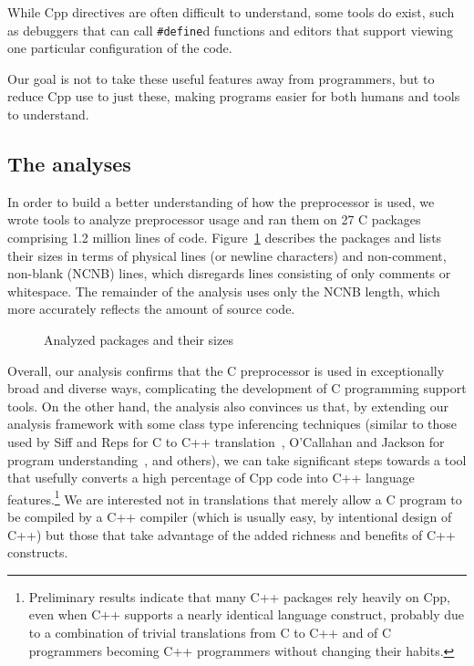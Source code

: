 \documentclass[11pt]{article}
\def\numpackages{27}
\def\numlines{1.2 million}
\begin{document}

While Cpp directives are often difficult to understand, some tools do
exist, such as debuggers that can call {\tt \#define}d functions and
editors that support viewing one particular configuration of the code.

Our goal is not to take these useful features away from programmers, but to
reduce Cpp use to just these, making programs easier for both humans and
tools to understand.


\subsection{The analyses}

In order to build a better understanding of how the preprocessor is used,
we wrote tools to analyze preprocessor usage and ran them on {\numpackages}
C packages comprising {\numlines} lines of code.  Figure~\ref{fig:packages}
describes the packages and lists their sizes in terms of physical lines (or
newline characters) and non-comment, non-blank (NCNB) lines, which
disregards lines consisting of only comments or whitespace.  The remainder
of the analysis uses only the NCNB length, which more accurately reflects
the amount of source code.

\begin{figure}
\centering
{\small
  \setlength{\tabcolsep}{.25em}
  
}
\caption{Analyzed packages and their sizes}
\label{fig:packages}
\end{figure}


Overall, our analysis confirms that the C preprocessor is used in
exceptionally broad and diverse ways, complicating the development of C
programming support tools.  On the other hand, the analysis also convinces
us that, by extending our analysis framework with some class type
inferencing techniques (similar to those used by Siff and Reps for C to C++
translation~\cite{Siff-fse96}, O'Callahan and Jackson for program
understanding~\cite{OCallahan-icse97}, and others), we can take significant
steps towards a tool that usefully converts a high percentage of Cpp code
into C++ language features.\footnote{Preliminary results indicate that many
  C++ packages rely heavily on Cpp, even when C++ supports a nearly
  identical language construct, probably due to a combination of trivial
  translations from C to C++ and of C programmers becoming C++ programmers
  without changing their habits.} We are interested not in translations
that merely allow a C program to be compiled by a C++ compiler (which is
usually easy, by intentional design of C++) but those that take advantage
of the added richness and benefits of C++ constructs.
\end{document}
